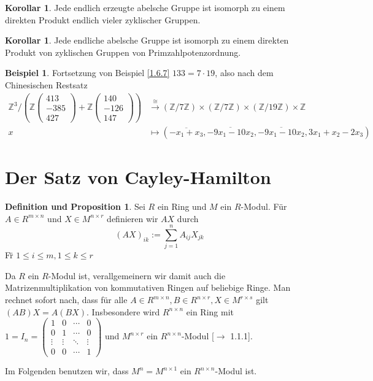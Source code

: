 \documentclass[
twoside=semi,
fontsize=12,
DIV=12, 
cleardoublepage=current,
leqno,
headings=optiontoheadandtoc, 
toc=idx
]{scrbook}
\newcommand{\Z}{\mathbb{Z}}
\newcommand{\brac}[1]{\left( #1 \right)}
\theoremstyle{definition}
\newtheorem{beispiel}[definition]{Beispiel}
\newtheorem{korollar}[definition]{Korollar}
\newtheorem{def-prop}[definition]{Definition und Proposition}
\begin{document}
	\begin{korollar}\label{1.6.10}\hfill\newline
		Jede endlich erzeugte abelsche Gruppe ist isomorph zu einem direkten Produkt endlich vieler zyklischer Gruppen.
	\end{korollar}

	\begin{korollar}\label{1.6.11}\hfill\newline
		Jede endliche abelsche Gruppe ist isomorph zu einem direkten Produkt von zyklischen Gruppen von Primzahlpotenzordnung.
	\end{korollar}

	\begin{beispiel}\label{1.6.12} Fortsetzung von Beispiel \ref{1.6.7}\newline
		$133 = 7 \cdot 19$, also nach dem Chinesischen Restsatz
		\begin{align*}
			\Z^3/\brac{\Z\begin{pmatrix}413\\-385\\427\end{pmatrix} + \Z\begin{pmatrix}140\\-126\\147\end{pmatrix}} &\overset{\cong}{\rightarrow} (\Z/7\Z) \times (\Z/7\Z) \times (\Z/19\Z) \times \Z\\
				x &\mapsto (\overline{-x_1+x_3}, \overline{-9x_1-10x_2}, \overline{-9x_1-10x_2}, 3x_1+x_2-2x_3)
		\end{align*}
	\end{beispiel}

	\newpage
	\section{Der Satz von Cayley-Hamilton}\thispagestyle{sectionstart}
	\begin{def-prop}\label{1.7.1}\hfill\newline
		Sei $R$ ein Ring und $M$ ein $R$-Modul. F\"ur $A \in R^{m\times n}$ und $X\in M^{n\times r}$ definieren wir $AX$ durch
			\[(AX)_{ik} := \sum_{j=1}^n A_{ij}X_{jk}\]
		F\"r $1\leq i \leq m, 1 \leq k \leq r$
		
		Da $R$ ein $R$-Modul ist, verallgemeinern wir damit auch die Matrizenmultiplikation von kommutativen Ringen auf beliebige Ringe. Man rechnet sofort nach, dass f\"ur alle $A \in R^{m\times n}, B \in R^{n \times r}, X \in M^{r \times s}$ gilt $(AB)X = A(BX)$. Insbesondere wird $R^{n \times n}$ ein Ring mit $1 = I_n = \begin{pmatrix}
			1 & 0 & \cdots & 0\\
			0 & 1 & \cdots & 0\\
			\vdots & \vdots & \ddots & \vdots\\
			0 & 0 & \cdots & 1
		\end{pmatrix}$ und $M^{n \times r}$ ein $R^{n \times n}$-Modul [$\to$ 1.1.1].
	
		\noindent Im Folgenden benutzen wir, dass $M^n = M^{n\times 1}$ ein $R^{n\times n}$-Modul ist.
	\end{def-prop}
	
\end{document}

